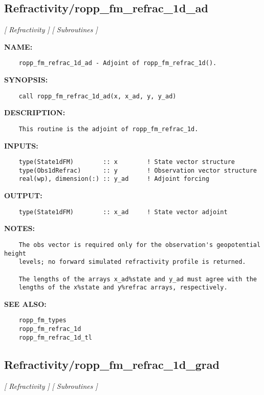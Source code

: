 \subsection{Refractivity/ropp\_fm\_refrac\_1d\_ad}
\textsl{[ Refractivity ]}
\textsl{[ Subroutines ]}

\label{ch:robo77}
\label{ch:Refractivity_ropp_fm_refrac_1d_ad}
\textbf{NAME:}\hspace{0.08in}\begin{Verbatim}
    ropp_fm_refrac_1d_ad - Adjoint of ropp_fm_refrac_1d().
\end{Verbatim}
\textbf{SYNOPSIS:}\hspace{0.08in}\begin{Verbatim}
    call ropp_fm_refrac_1d_ad(x, x_ad, y, y_ad)
\end{Verbatim}
\textbf{DESCRIPTION:}\hspace{0.08in}\begin{Verbatim}
    This routine is the adjoint of ropp_fm_refrac_1d.
\end{Verbatim}
\textbf{INPUTS:}\hspace{0.08in}\begin{Verbatim}
    type(State1dFM)        :: x        ! State vector structure
    type(Obs1dRefrac)      :: y        ! Observation vector structure
    real(wp), dimension(:) :: y_ad     ! Adjoint forcing
\end{Verbatim}
\textbf{OUTPUT:}\hspace{0.08in}\begin{Verbatim}
    type(State1dFM)        :: x_ad     ! State vector adjoint
\end{Verbatim}
\textbf{NOTES:}\hspace{0.08in}\begin{Verbatim}
    The obs vector is required only for the observation's geopotential height
    levels; no forward simulated refractivity profile is returned.

    The lengths of the arrays x_ad%state and y_ad must agree with the 
    lengths of the x%state and y%refrac arrays, respectively.
\end{Verbatim}
\textbf{SEE ALSO:}\hspace{0.08in}\begin{Verbatim}
    ropp_fm_types
    ropp_fm_refrac_1d
    ropp_fm_refrac_1d_tl
\end{Verbatim}
\subsection{Refractivity/ropp\_fm\_refrac\_1d\_grad}
\textsl{[ Refractivity ]}
\textsl{[ Subroutines ]}

